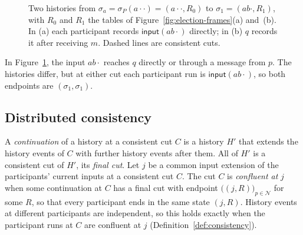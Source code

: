 \documentclass[sigconf]{cidr-2027}
\theoremstyle{remark}
\newcommand{\indesc}{input extension\xspace} %
\begin{document}
\begin{figure}[t]
  \caption{Two histories from $\sigma_a=\sigma_P(a\cdot\cdot)=(a\cdot\cdot,R_0)$ to
  $\sigma_1=(ab\cdot,R_1)$, with $R_0$ and $R_1$ the tables of
  Figure~\ref{fig:election-frames}(a) and~(b).  In (a) each participant records
  $\mathsf{input}(ab\cdot)$ directly; in (b) $q$ records it after receiving $m$.  Dashed lines are consistent cuts.}
  \label{fig:participant-runs}
\end{figure}

In Figure~\ref{fig:participant-runs}, the input $ab\cdot$ reaches $q$
directly or through a message from $p$. The histories differ, but at either
cut each participant run is $\mathsf{input}(ab\cdot)$, so both endpoints are
$(\sigma_1,\sigma_1)$.

\subsection{Distributed consistency}
\label{sec:distributed-consistency}

A \emph{continuation} of a history at a consistent cut $C$ is a history $H'$
that extends the history events of $C$ with further history events after
them. All of $H'$ is a consistent cut of $H'$, its \emph{final cut}. Let $j$ be a common \indesc of the participants' current inputs at a consistent cut $C$. The cut $C$ is \emph{confluent at} $j$ when some continuation at $C$ has a final cut with endpoint $\bigl((j,R)\bigr)_{p\in\mathcal N}$ for some $R$, so that every participant ends in the same state $(j,R)$. History events at different participants are independent, so this holds exactly when the participant runs at $C$ are
confluent at $j$ (Definition~\ref{def:consistency}).
\end{document}
